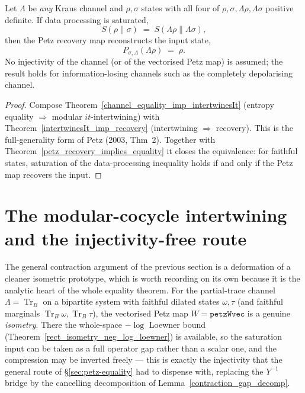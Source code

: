 \begin{theorem}\label{petz_equality_recovery_general}
  \leanok
  Let \(\Lambda\) be \emph{any} Kraus channel and \(\rho,\sigma\) states with all four of
  \(\rho,\sigma,\Lambda\rho,\Lambda\sigma\) positive definite. If data processing is saturated,
  \[
    S(\rho\|\sigma) \;=\; S(\Lambda\rho\|\Lambda\sigma),
  \]
  then the Petz recovery map reconstructs the input state,
  \[
    P_{\sigma,\Lambda}(\Lambda\rho) \;=\; \rho .
  \]
  No injectivity of the channel (or of the vectorised Petz map) is assumed; the result holds for
  information-losing channels such as the completely depolarising channel.
\end{theorem}
\begin{proof}\leanok
  Compose Theorem~\ref{channel_equality_imp_intertwinesIt} (entropy equality \(\Rightarrow\) modular
  \(it\)-intertwining) with Theorem~\ref{intertwinesIt_imp_recovery} (intertwining \(\Rightarrow\)
  recovery). This is the full-generality form of Petz (2003, Thm~2). Together with
  Theorem~\ref{petz_recovery_implies_equality} it closes the equivalence: for faithful states,
  saturation of the data-processing inequality holds if and only if the Petz map recovers the input.
\end{proof}

\section{The modular-cocycle intertwining and the injectivity-free route}
\label{sec:petz-intertwine}

The general contraction argument of the previous section is a deformation of a cleaner isometric
prototype, which is worth recording on its own because it is the analytic heart of the whole
equality theorem. For the partial-trace channel \(\Lambda=\operatorname{Tr}_B\) on a bipartite system
with faithful dilated states \(\omega,\tau\) (and faithful marginals
\(\operatorname{Tr}_B\omega,\operatorname{Tr}_B\tau\)), the vectorised Petz map \(W=\texttt{petzWvec}\)
is a genuine \emph{isometry}. There the whole-space \(-\log\) Loewner bound
(Theorem~\ref{rect_isometry_neg_log_loewner}) is available, so the saturation input can be taken as a
full operator gap rather than a scalar one, and the compression may be inverted freely --- this is
exactly the injectivity that the general route of \S\ref{sec:petz-equality} had to dispense with,
replacing the \(Y^{-1}\) bridge by the cancelling decomposition of
Lemma~\ref{contraction_gap_decomp}.

